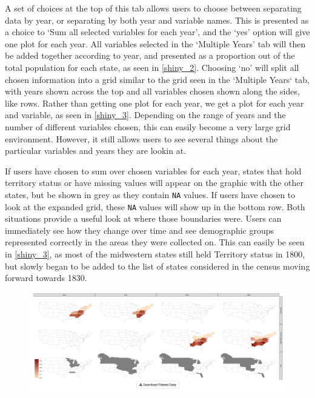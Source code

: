 \documentclass[DIV=calc, paper=a4, fontsize=10pt, twocolumn]{scrartcl}\usepackage[]{graphicx}\usepackage[]{color}
\begin{document}
\par A set of choices at the top of this tab allows users to choose between separating data by year, or separating by both year and variable names. This is presented as a choice to `Sum all selected variables for each year', and the `yes' option will give one plot for each year. All variables selected in the `Multiple Years' tab will then be added together according to year, and presented as a proportion out of the total population for each state, as seen in \autoref{shiny_2}. Choosing `no' will split all chosen information into a grid similar to the grid seen in the `Multiple Years` tab, with years shown across the top and all variables chosen shown along the sides, like rows. Rather than getting one plot for each year, we get a plot for each year and variable, as seen in \autoref{shiny_3}. Depending on the range of years and the number of different variables chosen, this can easily become a very large grid environment. However, it still allows users to see several things about the particular variables and years they are lookin at. 

\par If users have chosen to sum over chosen variables for each year, states that hold territory status or have missing values will appear on the graphic with the other states, but be shown in grey as they contain \texttt{NA} values. If users have chosen to look at the expanded grid, these \texttt{NA} values will show up in the bottom row. Both situations provide a useful look at where those boundaries were. Users can immediately see how they change over time and see demographic groups represented correctly in the areas they were collected on. This can easily be seen in \autoref{shiny_3}, as most of the midwestern states still held Territory status in 1800, but slowly began to be added to the list of states considered in the census moving forward towards 1830.   


\begin{figure}[hbtp]
\centering
\includegraphics[width=\textwidth]{./figures/visualize_slaves_40years.png}  
\label{shiny_3}
\end{figure}
\end{document}
